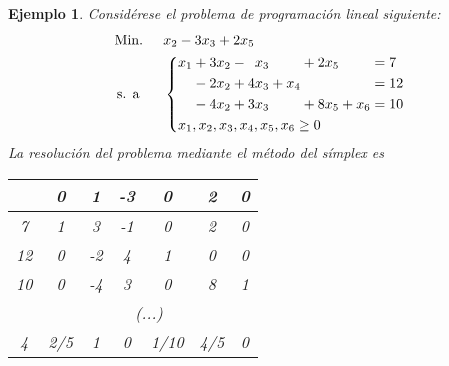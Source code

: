 \documentclass[11pt]{report}
\theoremstyle{mytheorem}
\theoremstyle{mydefinition}
\theoremstyle{myexample}
\newtheorem*{example}{Ejemplo}
\begin{document}
\begin{example}
Considérese el problema de programación lineal siguiente:
\[\begin{aligned}[t]
&\text{Min. } && x_2-3x_3+2x_5 \\
& \, \text{s. a} &&\left\{\begin{alignedat}{10}
& &x_1 & {}+{} & 3x_2 & {}-{} &  &x_3 &       &     & {}+{} & 2x_5 &       &     & {}={} & 7 \\
& &    & {}-{} & 2x_2 & {}+{} & 4&x_3 & {}+{} & x_4 &       &      &       &     & {}={} & 12 \\
& &    & {}-{} & 4x_2 & {}+{} & 3&x_3 &       &     & {}+{} & 8x_5 & {}+{} & x_6 & {}={} & 10 \\
&\mathrlap{x_1,x_2,x_3,x_4,x_5,x_6 \geq 0}
\end{alignedat}\right.
\end{aligned}\]
La resolución del problema mediante el método del símplex es
\begin{center}
\begin{tabular}{|c|c|c|c|c|c|c|}
    \cline{2-7}
    
    \multicolumn{1}{c|}{} & \multicolumn{1}{c}{0} & \multicolumn{1}{c}{\phantom{-}1} & \multicolumn{1}{c}{-3} & \multicolumn{1}{c}{\phantom{-}0} & \multicolumn{1}{c}{2} & \multicolumn{1}{c|}{0} \\ \hline
    
    \phantom{-}7 & \multicolumn{1}{c}{1} & \multicolumn{1}{c}{\phantom{-}3} & \multicolumn{1}{c}{-1} & \multicolumn{1}{c}{\phantom{-}0} & \multicolumn{1}{c}{2} & \multicolumn{1}{c|}{0} \\

    \phantom{-}12 & \multicolumn{1}{c}{0} & \multicolumn{1}{c}{-2} & \multicolumn{1}{c}{\phantom{-}4} & \multicolumn{1}{c}{\phantom{-}1} & \multicolumn{1}{c}{0} & \multicolumn{1}{c|}{0} \\
    
    \phantom{-}10 & \multicolumn{1}{c}{0} & \multicolumn{1}{c}{-4} & \multicolumn{1}{c}{\phantom{-}3} & \multicolumn{1}{c}{\phantom{-}0} & \multicolumn{1}{c}{8} & \multicolumn{1}{c|}{1} \\ \hhline{|=|=|=|=|=|=|=|}

    \multicolumn{1}{|c|}{\phantom{-}(...)} & \multicolumn{6}{c|}{(...)} \\ \hhline{|=|=|=|=|=|=|=|}
    
    \phantom{-}4 & \multicolumn{1}{c}{2/5} & \multicolumn{1}{c}{\phantom{-}1} & \multicolumn{1}{c}{\phantom{-}0} & \multicolumn{1}{c}{\phantom{-}1/10}& \multicolumn{1}{c}{4/5} & \multicolumn{1}{c|}{0}  \\


\end{tabular}
\end{center}
\end{example}
\end{document}
